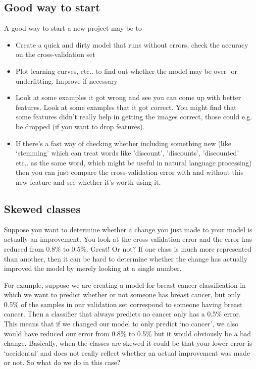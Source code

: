 \documentclass[a4paper, 10pt,hidelinks]{article}
\begin{document}
\subsection{Good way to start}
A good way to start a new project may be to
\begin{itemize}
\item Create a quick and dirty model that runs without errors, check the accuracy on the cross-validation set
\item Plot learning curves, etc.. to find out whether the  model may be over- or underfitting. Improve if necessary
\item Look at some examples it got wrong and see you can come up with better features. Look at some examples that it got correct. You might find that some features didn't really help in getting the images correct, those could e.g. be dropped (if you want to drop features).
\item If there's a fast way of checking whether including something new (like `stemming' which can treat words like 'discount', 'discounts', 'discounted' etc.. as the same word, which might be useful in natural language processing) then you can just compare the cross-validation error with and without this new feature and see whether it's worth using it.
\end{itemize}


\subsection{Skewed classes}
Suppose you want to determine whether a change you just made to your model is actually an improvement. You look at the cross-validation error and the error has reduced from 0.8\% to 0.5\%. Great! Or not? If one class is much more represented than another, then it can be hard to determine whether the change has actually improved the model by merely looking at a single number. 

For example, suppose we are creating a model for breast cancer classification in which we want to predict whether or not someone has breast cancer, but only 0.5\% of the samples in our validation set correspond to someone having breast cancer. Then a classifier that always predicts no cancer only has a 0.5\% error. This means that if we changed our model to only predict `no cancer', we also would have reduced our error from 0.8\% to 0.5\% but it would obviously be a bad change. Basically, when the classes are skewed it could be that your lower error is `accidental' and does not really reflect whether an actual improvement was made or not. So what do we do in this case?
\end{document}
